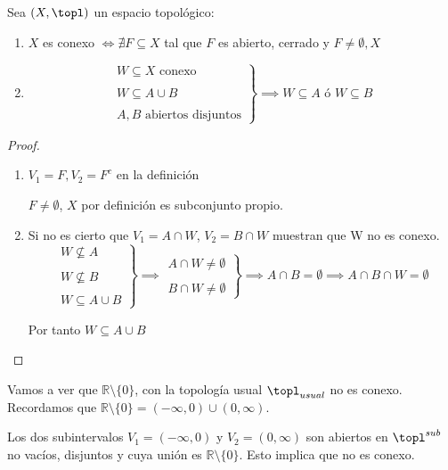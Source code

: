 \documentclass{apuntes}
\begin{document}
\begin{prop}
	Sea $(X,\topl)$ un espacio topológico:

	\begin{enumerate}
		\item $X$ es conexo $\iff ∄F ⊆ X$ tal que $F$ es abierto, cerrado y $F≠ \emptyset, X$

		\item
		\[\left.
			\begin{array}{cc}
				W ⊆ X \text{\ conexo} \\ \\
				W ⊆ A \cup B \\ \\
				A,B \text{\ abiertos disjuntos}
			\end{array}
		\right\} \implies W ⊆ A \text{\ ó \ } W ⊆ B \]
	\end{enumerate}
\end{prop}

\begin{proof}
	\begin{enumerate}
		\item $V_1 = F, V_2 = F^c$ en la definición
		\begin{remark}
			$F ≠ \emptyset$, $X$ por definición es subconjunto propio.
		\end{remark}

		\item Si no es cierto que $V_1 = A \cap W$, $ V_2 = B \cap W$ muestran que W no es conexo.\\
		\[\left.
			\begin{array}{cc}
				W \nsubseteq A \\ \\
				W \nsubseteq B \\ \\
				W ⊆ A \cup B
			\end{array}
		\right\} \implies
		\left.
			\begin{array}{cc}
				A \cap W ≠ \emptyset \\ \\
				B \cap W ≠ \emptyset
			\end{array}
		\right\} \implies
		A \cap B = \emptyset \implies A\cap B \cap W = \emptyset
		\]

		Por tanto $W ⊆ A \cup B$
	\end{enumerate}
\end{proof}


\begin{example} Vamos a ver que $ℝ \setminus \{0\}$, con la topología usual $\topl_{usual}$ no es conexo. Recordamos que $ℝ \setminus \{0\} = (-∞, 0) \cup (0, ∞)$.

Los dos subintervalos $V_1 = (-∞ , 0)$ y $V_2 = (0, ∞)$ son abiertos en  $\topl^{sub}$ no vacíos, disjuntos y cuya unión es $ℝ \setminus \{0\}$. Esto implica que no es conexo.
\end{example}
\end{document}
